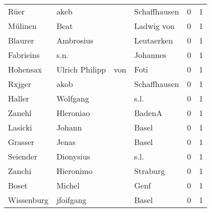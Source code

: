 \documentclass[10pt,a4paper,landscape]{article}
\begin{document}
\begin{longtable}{llllrr}
                     Rüer &                               akeb &             &                                Schaffhausen &          0 &         1 \\
                  Mülinen &                               Beat &             &                                  Ladwig von &          0 &         1 \\
                  Blaurer &                          Ambrosius &             &                                  Leutaerken &          0 &         1 \\
                Fabrieins &                               s.n. &             &                                    Johannes &          0 &         1 \\
                 Hohensax &                     Ulrich Philipp &         von &                                        Foti &          0 &         1 \\
                   Rxjger &                               akob &             &                                Schaffhausen &          0 &         1 \\
                   Haller &                           Wolfgang &             &                                        s.l. &          0 &         1 \\
                   Zanehl &                          Hleroniao &             &                                      BadenA &          0 &         1 \\
                  Lasicki &                             Johann &             &                                       Basel &          0 &         1 \\
                  Grasser &                              Jenas &             &                                       Basel &          0 &         1 \\
                 Seiender &                          Dionysius &             &                                        s.l. &          0 &         1 \\
                   Zanchi &                          Hieronimo &             &                                    Straburg &          0 &         1 \\
                    Boset &                             Michel &             &                                        Genf &          0 &         1 \\
               Wissenburg &                          jfoifgang &             &                                       Basel &          0 &         1 \\

\end{longtable}
\end{document}
